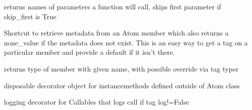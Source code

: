 \documentclass[letterpaper,10pt,english]{sphinxmanual}
\begin{document}
\begin{fulllineitems}
\label{core_doc/atom_extension:taref.core.atom_extension.get_run_params}
returns names of parameters a function will call, skips first parameter if skip\_first is True

\end{fulllineitems}


\begin{fulllineitems}
\label{core_doc/atom_extension:taref.core.atom_extension.get_tag}
Shortcut to retrieve metadata from an Atom member which also returns a none\_value if the metadata does not exist.
This is an easy way to get a tag on a particular member and provide a default if it isn't there.

\end{fulllineitems}


\begin{fulllineitems}
\label{core_doc/atom_extension:taref.core.atom_extension.get_type}
returns type of member with given name, with possible override via tag typer

\end{fulllineitems}


\begin{fulllineitems}
\label{core_doc/atom_extension:taref.core.atom_extension.instancemethod}
disposable decorator object for instancemethods defined outside of Atom class

\end{fulllineitems}


\begin{fulllineitems}
\label{core_doc/atom_extension:taref.core.atom_extension.log_func}
logging decorator for Callables that logs call if tag log!=False

\end{fulllineitems}
\end{document}
